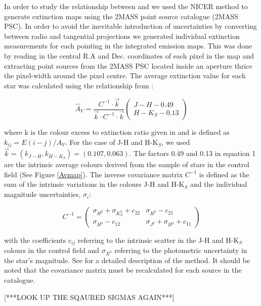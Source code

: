 \documentclass{aa}
\begin{document}
In order to study the relationship between \eco and \htwo we used the NICER method \citep{nicer} to generate extinction maps using the 2MASS point source catalogue (2MASS PSC). In order to avoid the inevitable introduction of uncertainties by converting between radio and tangential projections we generated individual extinction measurements for each pointing in the \eco integrated emission maps. This was done by reading in the central R.A and Dec. coordinates of each pixel in the \ieco map and extracting point sources from the 2MASS PSC \citep{2mass} located inside an aperture thrice the pixel-width around the pixel centre. The average extinction value for each star was calculated using the relationship from \citet{nicer}:

\begin{equation}
\hat{A}_V= \frac{C^{-1} \cdot \vec{k}}{\vec{k} \cdot C^{-1} \cdot \vec{k}}
\begin{pmatrix}
J-H - 0.49 \\ H-K_S - 0.13
\end{pmatrix}
\end{equation}

where k is the colour excess to extinction ratio given in \citet{rieke85} and is defined as $k_{ij}=E(i-j)/A_V$. For the case of J-H and H-K$_S$, we used $\vec{k}=(k_{J-H}, k_{H-K_S})=(0.107, 0.063)$. The factors 0.49 and 0.13 in equation 1 are the intrinsic average colours derived from the sample of stars in the control field (See Figure \ref{Avmap}). The inverse covariance matrix $C^{-1}$ is defined as the sum of the intrinsic variations in the colours J-H and H-K$_S$ and the individual magnitude uncertainties, $\sigma_i$:

\begin{equation}
C^{-1}=
\begin{pmatrix}
\sigma_{H^2}+\sigma_{K_S^2} + c_{22} & \sigma_{H^2} - c_{21} \\
\sigma_{H^2} - c_{12} & \sigma_{J^2}+\sigma_{H^2} + c_{11}
\end{pmatrix}
\end{equation}

with the coefficients $c_{ij}$ referring to the intrinsic scatter in the J-H and H-K$_S$ colours in the control field and $\sigma_{X^2}$ referring to the photometric uncertainty in the star's magnitude. See \citet{nicer} for a detailed description of the method. It should be noted that the covariance matrix must be recalculated for each source in the catalogue.

[***LOOK UP THE SQAURED SIGMAS AGAIN***]
\end{document}
